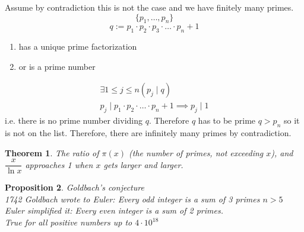 \documentclass[letterpaper, 12pt]{article}
\newtheorem{theorem}{Theorem}[section]
\newtheorem{proposition}[theorem]{Proposition}
\newenvironment{proof}[1][Proof]{\begin{trivlist}
\item[\hskip \labelsep {\bfseries #1}]}{\end{trivlist}}
\newcommand{\0}{\emptyset}
\begin{document}
    \begin{proof}
        Assume by contradiction this is not the case and we have finitely many primes.
        \[\{p_1, \dots, p_n\}\]
        \[q := p_1 \cdot p_2 \cdot p_3 \cdot \dots \cdot p_n + 1\]
        \begin{enumerate}
            \item has a unique prime factorization
            \item or is a prime number
        \end{enumerate}
        \begin{gather*}
            \exists 1 \le j \le n (p_j \mid q) \\
            p_j \mid p_1 \cdot p_2 \cdot \dots \cdot p_n + 1 \implies p_j \mid 1
        \end{gather*}
        i.e. there is no prime number dividing $q$. Therefore $q$ has to be prime $q > p_n$ 
        so it is not on the list. Therefore, there are infinitely many primes by contradiction.
    \end{proof}
    \begin{theorem}
        The ratio of $\pi(x)$ (the number of primes, not exceeding $x$), and $\dfrac{x}{\ln x}$ 
        approaches 1 when $x$ gets larger and larger.
    \end{theorem}
    \begin{proposition}
        Goldbach's conjecture \\
        1742 Goldbach wrote to Euler: Every odd integer is a sum of 3 primes $n > 5$ \\
        Euler simplified it: Every even integer is a sum of 2 primes. \\
        \textit{True for all positive numbers up to $4 \cdot 10^{18}$}
    \end{proposition}
\end{document}
